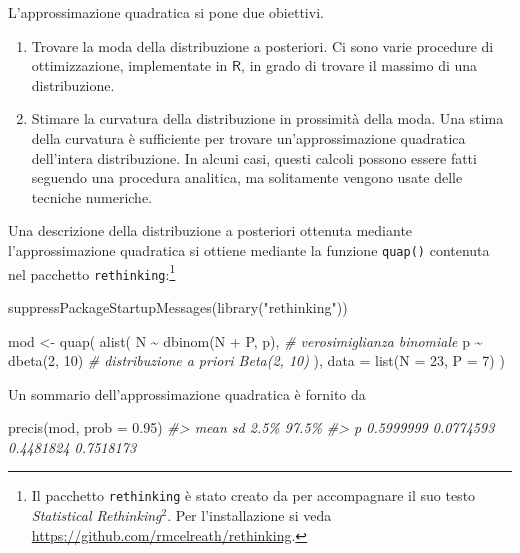\documentclass[
]{memoir}
\newenvironment{Shaded}{\begin{snugshade}}{\end{snugshade}}
\newcommand{\AttributeTok}[1]{\textcolor[rgb]{0.77,0.63,0.00}{#1}}
\newcommand{\CommentTok}[1]{\textcolor[rgb]{0.56,0.35,0.01}{\textit{#1}}}
\newcommand{\DecValTok}[1]{\textcolor[rgb]{0.00,0.00,0.81}{#1}}
\newcommand{\FloatTok}[1]{\textcolor[rgb]{0.00,0.00,0.81}{#1}}
\newcommand{\FunctionTok}[1]{\textcolor[rgb]{0.00,0.00,0.00}{#1}}
\newcommand{\NormalTok}[1]{#1}
\newcommand{\OtherTok}[1]{\textcolor[rgb]{0.56,0.35,0.01}{#1}}
\newcommand{\SpecialCharTok}[1]{\textcolor[rgb]{0.00,0.00,0.00}{#1}}
\newcommand{\StringTok}[1]{\textcolor[rgb]{0.31,0.60,0.02}{#1}}
\newcommand{\R}{\textsf{R}} %
\begin{document}
L'approssimazione quadratica si pone due obiettivi.

\begin{enumerate}
\def\labelenumi{\arabic{enumi}.}
\item
  Trovare la moda della distribuzione a posteriori. Ci sono varie
  procedure di ottimizzazione, implementate in \(\R\), in
  grado di trovare il massimo di una distribuzione.
\item
  Stimare la curvatura della distribuzione in prossimità della moda.
  Una stima della curvatura è sufficiente per trovare
  un'approssimazione quadratica dell'intera distribuzione. In alcuni
  casi, questi calcoli possono essere fatti seguendo una procedura
  analitica, ma solitamente vengono usate delle tecniche numeriche.
\end{enumerate}

Una descrizione della distribuzione a posteriori ottenuta mediante l'approssimazione quadratica si ottiene mediante la funzione \texttt{quap()} contenuta nel pacchetto \texttt{rethinking}:\footnote{Il pacchetto \texttt{rethinking} è stato creato da \citet{McElreath_rethinking} per accompagnare il suo testo \emph{Statistical Rethinking}\(^2\). Per l'installazione si veda \url{https://github.com/rmcelreath/rethinking}.}

\begin{Shaded}
\begin{Highlighting}[]
\FunctionTok{suppressPackageStartupMessages}\NormalTok{(}\FunctionTok{library}\NormalTok{(}\StringTok{"rethinking"}\NormalTok{))}

\NormalTok{mod }\OtherTok{\textless{}{-}} \FunctionTok{quap}\NormalTok{(}
  \FunctionTok{alist}\NormalTok{(}
\NormalTok{  N }\SpecialCharTok{\textasciitilde{}} \FunctionTok{dbinom}\NormalTok{(N }\SpecialCharTok{+}\NormalTok{ P, p), }\CommentTok{\# verosimiglianza binomiale}
\NormalTok{  p }\SpecialCharTok{\textasciitilde{}} \FunctionTok{dbeta}\NormalTok{(}\DecValTok{2}\NormalTok{, }\DecValTok{10}\NormalTok{) }\CommentTok{\# distribuzione a priori Beta(2, 10)}
\NormalTok{  ),}
  \AttributeTok{data =} \FunctionTok{list}\NormalTok{(}\AttributeTok{N =} \DecValTok{23}\NormalTok{, }\AttributeTok{P =} \DecValTok{7}\NormalTok{)}
\NormalTok{)}
\end{Highlighting}
\end{Shaded}

Un sommario dell'approssimazione quadratica è fornito da

\begin{Shaded}
\begin{Highlighting}[]
\FunctionTok{precis}\NormalTok{(mod, }\AttributeTok{prob =} \FloatTok{0.95}\NormalTok{)}
\CommentTok{\#\textgreater{}        mean        sd      2.5\%     97.5\%}
\CommentTok{\#\textgreater{} p 0.5999999 0.0774593 0.4481824 0.7518173}
\end{Highlighting}
\end{Shaded}
\end{document}
